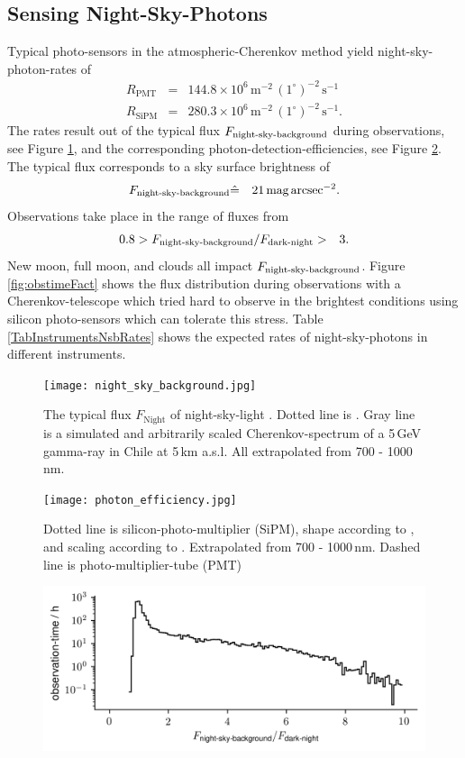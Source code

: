 \documentclass{article}%
\begin{document}
\begin{multicols}{2}
\section*{Sensing Night-Sky-Photons}%
\label{sec:nsb}%
%
Typical photo-sensors in the atmospheric-Cherenkov method yield night-sky-photon-rates of
\begin{eqnarray*}
R_\text{PMT} &=& 144.8\times10^6\,\text{m}^{-2}\,(1^\circ)^{-2}\,\text{s}^{-1}\\
R_\text{SiPM} &=& 280.3\times10^6\,\text{m}^{-2}\,(1^\circ)^{-2}\,\text{s}^{-1}.
\end{eqnarray*}
%
The rates result out of the typical flux $F_\text{night-sky-background}{}$ during observations, see Figure \ref{fig:nsb}, and the corresponding photon-detection-efficiencies, see Figure \ref{fig:pde}.
%
The typical flux  corresponds to a sky surface brightness of
%
\begin{eqnarray*}
F_\text{night-sky-background}{} &\hat{=}& 21\,\text{mag}\,\text{arcsec}^{-2}.
\end{eqnarray*}
%
Observations take place in the range of fluxes from
\begin{eqnarray*}
0.8 &> F_\text{night-sky-background}{} / F_\text{dark-night}{} >& 3.
\end{eqnarray*}
%
New moon, full moon, and clouds all impact $F_\text{night-sky-background}{}$.
%
Figure \ref{fig:obstimeFact} shows the flux distribution during observations with a Cherenkov-telescope which tried hard to observe in the brightest conditions using silicon photo-sensors which can tolerate this stress.
%
Table \ref{TabInstrumentsNsbRates} shows the expected rates of night-sky-photons in different instruments.
%
\begin{figure}[H]%
\centering%
\texttt{[image: night\_sky\_background.jpg]}%
\caption{
The typical flux $F_\text{Night}$ of night-sky-light \cite{gaug2013night}.
Dotted line is \cite{preuss2002study}.
Gray line is a simulated and arbitrarily scaled Cherenkov-spectrum of a 5\,GeV gamma-ray in Chile at 5\,km a.s.l.
All extrapolated from 700 - 1000\,nm.
}%
\label{fig:nsb}
\end{figure}
%
\begin{figure}[H]%
\centering%
\texttt{[image: photon\_efficiency.jpg]}%
\caption{
Dotted line is silicon-photo-multiplier (SiPM), shape according to \cite{hamamatsu2009mppc}, and scaling according to \cite{anderhub2013design}.
Extrapolated from 700 - 1000\,nm.
Dashed line is photo-multiplier-tube (PMT) \cite{toyama2013novel}
}%
\label{fig:pde}
\end{figure}
%
\begin{figure}[H]%
\centering%
\includegraphics[width=1.0\linewidth]{observation_time_histogram.png}%

\end{figure}
\end{multicols}
\end{document}
